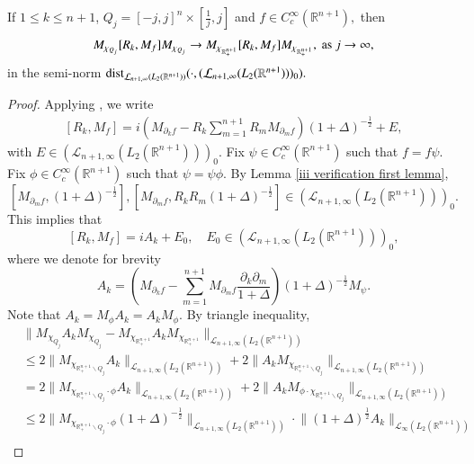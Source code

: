 \documentclass[12pt]{amsart}
\begin{document}
\begin{lemma}\label{ii verification lemma} If $1\leq k\leq n+1$, $Q_j=[-j,j]^n\times[\frac1j,j]$ and $f\in C^{\infty}_c(\mathbb{R}^{n+1}),$ then
$$M_{\chi_{Q_j}}[R_k,M_f]M_{\chi_{Q_j}}\to M_{\chi_{\mathbb{R}^{n+1}_+}}[R_k,M_f]M_{\chi_{\mathbb{R}^{n+1}_+}},\ {\rm as}\ j\rightarrow \infty,$$
in the semi-norm ${\rm dist}_{\mathcal{L}_{n+1,\infty}(L_2(\mathbb{R}^{n+1}))}(\cdot,(\mathcal{L}_{n+1,\infty}(L_2(\mathbb{R}^{n+1})))_0).$
\end{lemma}
\begin{proof} Applying \cite[Theorem 6.3.1]{LSZ2}, we write
\begin{align}\label{equ00}
[R_k,M_f]=i\left(M_{\partial_k f}-R_k\sum_{m=1}^{n+1}R_mM_{\partial_m f}\right)(1+\Delta)^{-\frac12}+E,
\end{align}
with $E\in (\mathcal{L}_{n+1,\infty}(L_2(\mathbb{R}^{n+1})))_0.$ Fix $\psi\in C^{\infty}_c(\mathbb{R}^{n+1})$ such that $f=f\psi.$ Fix $\phi\in C^{\infty}_c(\mathbb{R}^{n+1})$ such that $\psi=\psi\phi.$ By Lemma \ref{iii verification first lemma},
$$[M_{\partial_mf},(1+\Delta)^{-\frac12}],[M_{\partial_mf},R_kR_m(1+\Delta)^{-\frac12}]\in (\mathcal{L}_{n+1,\infty}(L_2(\mathbb{R}^{n+1})))_0.$$
This implies that
$$[R_k,M_f]=iA_k+E_0,\quad E_0\in (\mathcal{L}_{n+1,\infty}(L_2(\mathbb{R}^{n+1})))_0,$$
where we denote for brevity
$$A_k=\left(M_{\partial_k f}-\sum_{m=1}^{n+1}M_{\partial_m f}\frac{\partial_k\partial_m}{1+\Delta}\right)(1+\Delta)^{-\frac12}M_{\psi}.$$
Note that $A_k=M_{\phi}A_k=A_kM_{\phi}.$ By triangle inequality,
\begin{align*}
&\Big\|M_{\chi_{Q_j}}A_kM_{\chi_{Q_j}}-M_{\chi_{\mathbb{R}^{n+1}_+}}A_k M_{\chi_{\mathbb{R}^{n+1}_+}}\Big\|_{\mathcal{L}_{n+1,\infty}(L_2(\mathbb{R}^{n+1}))}\\
&\leq 2\Big\|M_{\chi_{\mathbb{R}^{n+1}_+\backslash Q_j}}A_k\Big\|_{\mathcal{L}_{n+1,\infty}(L_2(\mathbb{R}^{n+1}))}+2\Big\|A_kM_{\chi_{\mathbb{R}^{n+1}_+\backslash Q_j}}\Big\|_{\mathcal{L}_{n+1,\infty}(L_2(\mathbb{R}^{n+1}))}\\
&=2\Big\|M_{\chi_{\mathbb{R}^{n+1}_+\backslash Q_j}\cdot\phi}A_k\Big\|_{\mathcal{L}_{n+1,\infty}(L_2(\mathbb{R}^{n+1}))}+2\Big\|A_kM_{\phi\cdot\chi_{\mathbb{R}^{n+1}_+\backslash Q_j}}\Big\|_{\mathcal{L}_{n+1,\infty}(L_2(\mathbb{R}^{n+1}))}\\
&\leq 2\Big\|M_{\chi_{\mathbb{R}^{n+1}_+\backslash Q_j}\cdot\phi}(1+\Delta)^{-\frac12}\Big\|_{\mathcal{L}_{n+1,\infty}(L_2(\mathbb{R}^{n+1}))}\cdot \Big\|(1+\Delta)^{\frac12}A_k\Big\|_{\mathcal{L}_{\infty}(L_2(\mathbb{R}^{n+1}))}\\

\end{align*}
\end{proof}
\end{document}
